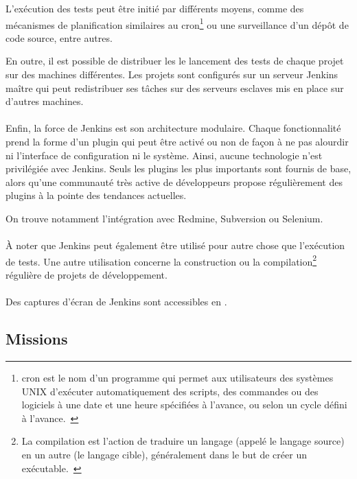 L'exécution des tests peut être initié par différents moyens, comme des mécanismes de planification similaires au cron\footnote{cron est le nom d'un programme qui permet aux utilisateurs des systèmes UNIX d'exécuter automatiquement des scripts, des commandes ou des logiciels à une date et une heure spécifiées à l'avance, ou selon un cycle défini à l'avance.~\cite{cron}} ou une surveillance d'un dépôt de code source, entre autres.

En outre, il est possible de distribuer les le lancement des tests de chaque projet sur des machines différentes.
Les projets sont configurés sur un serveur Jenkins maître qui peut redistribuer ses tâches sur des serveurs esclaves mis en place sur d'autres machines.

\paragraph{}
Enfin, la force de Jenkins est son architecture modulaire.
Chaque fonctionnalité prend la forme d'un plugin qui peut être activé ou non de façon à ne pas alourdir ni l'interface de configuration ni le système.
Ainsi, aucune technologie n'est privilégiée avec Jenkins.
Seuls les plugins les plus importants sont fournis de base, alors qu'une communauté très active de développeurs propose régulièrement des plugins à la pointe des tendances actuelles.

On trouve notamment l'intégration avec Redmine, Subversion ou Selenium. 

\paragraph{}
À noter que Jenkins peut également être utilisé pour autre chose que l'exécution de tests.
Une autre utilisation concerne la construction ou la compilation\footnote{La compilation est l'action de traduire un langage (appelé le langage source) en un autre (le langage cible), généralement dans le but de créer un exécutable.~\cite{compilation}} régulière de projets de développement.

\paragraph{}
Des captures d'écran de Jenkins sont accessibles en .



\subsection{Missions}

